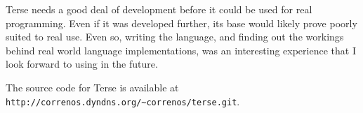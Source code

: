 \documentclass[12pt]{report}
\newcommand{\code}[1]{\texttt{#1}}
\begin{document}
Terse needs a good deal of development before it could be used for
real programming. Even if it was developed further, its base would
likely prove poorly suited to real use. Even so, writing the language,
and finding out the workings behind real world language
implementations, was an interesting experience that I look forward to
using in the future.

\clearpage

\printbibliography

The source code for Terse is available at
\code{http://correnos.dyndns.org/\textasciitilde{}correnos/terse.git}.
\end{document}

